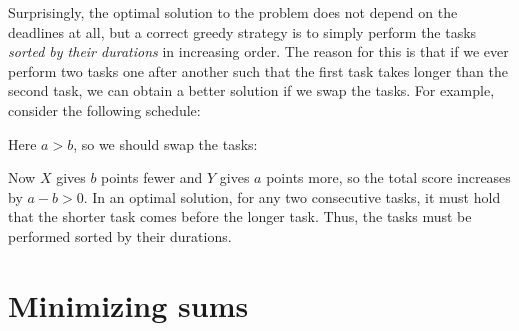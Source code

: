 Surprisingly, the optimal solution to the problem
does not depend on the deadlines at all,
but a correct greedy strategy is to simply
perform the tasks \emph{sorted by their durations}
in increasing order.
The reason for this is that if we ever perform
two tasks one after another such that the first task
takes longer than the second task,
we can obtain a better solution if we swap the tasks.
For example, consider the following schedule:
\begin{center}
\end{center}
Here $a>b$, so we should swap the tasks:
\begin{center}
\end{center}
Now $X$ gives $b$ points fewer and $Y$ gives $a$ points more,
so the total score increases by $a-b > 0$.
In an optimal solution,
for any two consecutive tasks,
it must hold that the shorter task comes
before the longer task.
Thus, the tasks must be performed
sorted by their durations.

\section{Minimizing sums}

